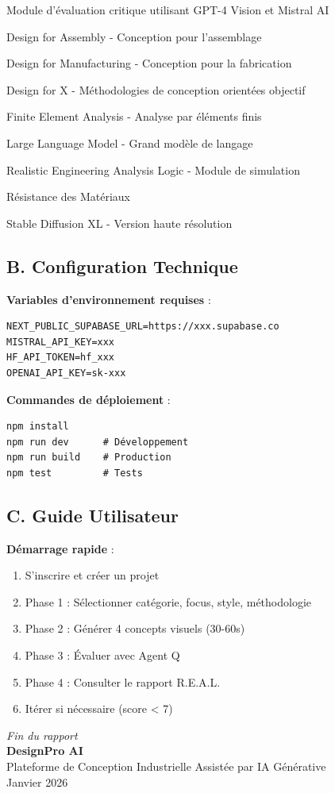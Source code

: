 \documentclass[12pt,a4paper]{article}
\begin{document}
\begin{description}[leftmargin=3cm, style=nextline]
    \item[Agent Q] Module d'évaluation critique utilisant GPT-4 Vision et Mistral AI
    \item[DFA] Design for Assembly - Conception pour l'assemblage
    \item[DFM] Design for Manufacturing - Conception pour la fabrication
    \item[DfX] Design for X - Méthodologies de conception orientées objectif
    \item[FEA] Finite Element Analysis - Analyse par éléments finis
    \item[LLM] Large Language Model - Grand modèle de langage
    \item[R.E.A.L.] Realistic Engineering Analysis Logic - Module de simulation
    \item[RDM] Résistance des Matériaux
    \item[SDXL] Stable Diffusion XL - Version haute résolution
\end{description}

\subsection*{B. Configuration Technique}

\textbf{Variables d'environnement requises} :
\begin{verbatim}
NEXT_PUBLIC_SUPABASE_URL=https://xxx.supabase.co
MISTRAL_API_KEY=xxx
HF_API_TOKEN=hf_xxx
OPENAI_API_KEY=sk-xxx
\end{verbatim}

\textbf{Commandes de déploiement} :
\begin{verbatim}
npm install
npm run dev      # Développement
npm run build    # Production
npm test         # Tests
\end{verbatim}

\subsection*{C. Guide Utilisateur}

\textbf{Démarrage rapide} :
\begin{enumerate}
    \item S'inscrire et créer un projet
    \item Phase 1 : Sélectionner catégorie, focus, style, méthodologie
    \item Phase 2 : Générer 4 concepts visuels (30-60s)
    \item Phase 3 : Évaluer avec Agent Q
    \item Phase 4 : Consulter le rapport R.E.A.L.
    \item Itérer si nécessaire (score < 7)
\end{enumerate}

\vspace{2cm}
\begin{center}
\textit{Fin du rapport}\\
\vspace{0.5cm}
\textbf{DesignPro AI}\\
Plateforme de Conception Industrielle Assistée par IA Générative\\
Janvier 2026
\end{center}
\end{document}
